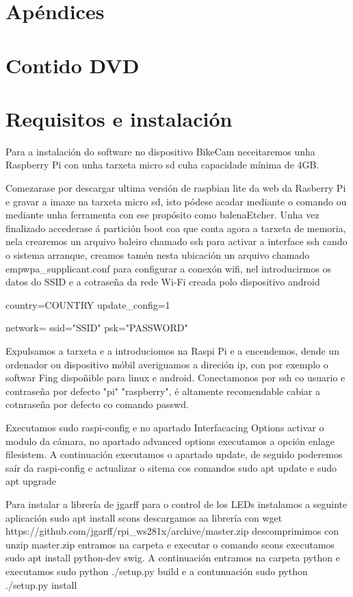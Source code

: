 \newpage
\chapter*{Apéndices}
\thispagestyle{empty}

\chapter{Contido DVD}

\chapter{Requisitos e instalación}
Para a instalación do software no dispositivo BikeCam neceitaremos unha Raspberry Pi con unha tarxeta micro sd cuha capacidade mínima de 4GB.

Comezarase por descargar ultima versión de raspbian lite da web da Rasberry Pi e gravar a imaxe na tarxeta micro sd, isto pódese acadar mediante o comando  ou mediante unha ferramenta con ese propósito como balenaEtcher.
Unha vez finalizado accederase á partición boot coa que conta agora a tarxeta de memoria, nela crearemos un arquivo baleiro chamado ssh para activar a interface ssh cando o sistema arranque, creamos tamén nesta ubicación un arquivo chamado emp{wpa_supplicant.conf} para configurar a conexón wifi, nel introducirmos os datos do SSID e a cotraseña da rede Wi-Fi creada polo dispositivo android

	country=COUNTRY
	update_config=1

	network={
	       ssid="SSID"
	       psk="PASSWORD"
	    }

Expulsamos a tarxeta e a introduciomos na Raspi Pi e a encendemos, dende un ordenador ou dispositivo móbil averiguamos a direción ip, con por exemplo o softwar Fing dispoñible para linux e android. Conectamonos por ssh co usuario e contraseña por defecto "pi" "raspberry", é altamente recomendable cabiar a cotnraseña por defecto co comando passwd.

Executamos sudo raspi-config e no apartado Interfacacing Options activar o modulo da cámara, no apartado advanced options executamos a opción enlage filesistem. A continuación executamos o apartado update, de seguido poderemos saír da raspi-config e actualizar o sitema cos comandos
sudo apt update e sudo apt upgrade

Para instalar a librería  de jgarff para o control de los LEDs instalamos a seguinte aplicación sudo apt install scons
descargamos aa librería con wget https://github.com/jgarff/rpi_ws281x/archive/master.zip
descomprimimos con unzip master.zip
entramos na carpeta e executar o comando scons
executamos sudo apt install python-dev swig. A continuación entramos na carpeta python e executamos sudo python ./setup.py build e a contunuación sudo python ./setup.py install

\newpage
\thispagestyle{empty}
